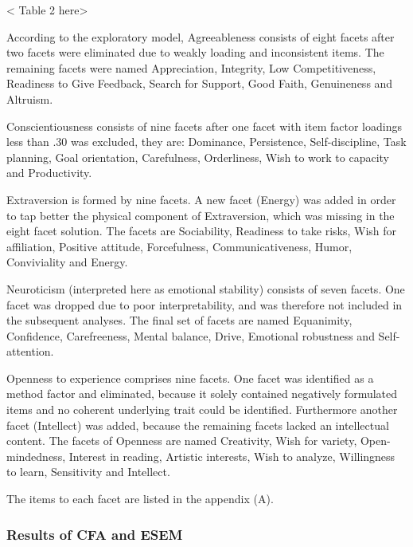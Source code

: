 \documentclass[,man,floatsintext]{apa6}
\begin{document}
\vspace{5mm}

\textless{} Table 2 here\textgreater{}

\vspace{5mm}

According to the exploratory model, Agreeableness consists of eight
facets after two facets were eliminated due to weakly loading and
inconsistent items. The remaining facets were named Appreciation,
Integrity, Low Competitiveness, Readiness to Give Feedback, Search for
Support, Good Faith, Genuineness and Altruism.

Conscientiousness consists of nine facets after one facet with item
factor loadings less than .30 was excluded, they are: Dominance,
Persistence, Self-discipline, Task planning, Goal orientation,
Carefulness, Orderliness, Wish to work to capacity and Productivity.

Extraversion is formed by nine facets. A new facet (Energy) was added in
order to tap better the physical component of Extraversion, which was
missing in the eight facet solution. The facets are Sociability,
Readiness to take risks, Wish for affiliation, Positive attitude,
Forcefulness, Communicativeness, Humor, Conviviality and Energy.

Neuroticism (interpreted here as emotional stability) consists of seven
facets. One facet was dropped due to poor interpretability, and was
therefore not included in the subsequent analyses. The final set of
facets are named Equanimity, Confidence, Carefreeness, Mental balance,
Drive, Emotional robustness and Self-attention.

Openness to experience comprises nine facets. One facet was identified
as a method factor and eliminated, because it solely contained
negatively formulated items and no coherent underlying trait could be
identified. Furthermore another facet (Intellect) was added, because the
remaining facets lacked an intellectual content. The facets of Openness
are named Creativity, Wish for variety, Open-mindedness, Interest in
reading, Artistic interests, Wish to analyze, Willingness to learn,
Sensitivity and Intellect.

The items to each facet are listed in the appendix (A).

\subsubsection{Results of CFA and ESEM}\label{results-of-cfa-and-esem}
\end{document}
